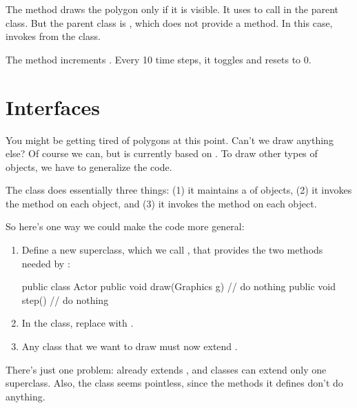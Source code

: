 The  method draws the polygon only if it is visible.
It uses  to call  in the parent class.
But the parent class is , which does not provide a  method.
In this case,  invokes  from the  class.

The  method increments .
Every 10 time steps, it toggles  and resets  to 0.


\section{Interfaces}

You might be getting tired of polygons at this point.
Can't we draw anything else?
Of course we can, but  is currently based on .
To draw other types of objects, we have to generalize the code.

The  class does essentially three things: (1) it maintains a  of objects, (2) it invokes the  method on each object, and (3) it invokes the  method on each object.

So here's one way we could make the code more general:

\begin{enumerate}

\item Define a new superclass, which we call , that provides the two methods needed by :

\begin{code}
public class Actor {
    public void draw(Graphics g) {
        // do nothing
    }
    public void step() {
        // do nothing
    }
}
\end{code}

\item In the  class, replace  with .

\item Any class that we want to draw must now extend .

\end{enumerate}

There's just one problem:  already extends , and classes can extend only one superclass.
Also, the  class seems pointless, since the methods it defines don't do anything.

